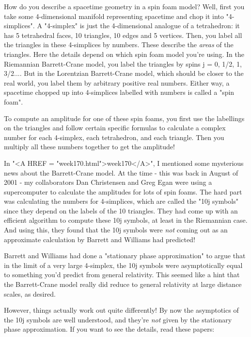 How do you describe a spacetime geometry in a spin foam model?
Well, first you take some 4-dimensional manifold representing 
spacetime and chop it into "4-simplices".  A "4-simplex" is 
just the 4-dimensional analogue of a tetrahedron: it has 5 
tetrahedral faces, 10 triangles, 10 edges and 5 vertices.  
Then, you label all the triangles in these 4-simplices by numbers.  
These describe the \emph{areas} of the triangles.  Here the details 
depend on which spin foam model you're using.  In the Riemannian 
Barrett-Crane model, you label the triangles by spins j = 0, 1/2, 
1, 3/2....  But in the Lorentzian Barrett-Crane model, which 
should be closer to the real world, you label them by arbitrary 
positive real numbers.   Either way, a spacetime chopped up into 
4-simplices labelled with numbers is called a "spin foam".

To compute an amplitude for one of these spin foams, you first use 
the labellings on the triangles and follow certain specific formulas
to calculate a complex number for each 4-simplex, each tetrahedron, 
and each triangle.  Then you multiply all these numbers together 
to get the amplitude!  

In "<A HREF = "week170.html">week170</A>", I mentioned some mysterious news about the Barrett-Crane 
model.  At the time - this was back in August of 2001 - my collaborators
Dan Christensen and Greg Egan were using a supercomputer to calculate 
the amplitudes for lots of spin foams.  The hard part was calculating 
the numbers for 4-simplices, which are called the "10j symbols" since 
they depend on the labels of the 10 triangles.  They had come up with 
an efficient algorithm to compute these 10j symbols, at least in the 
Riemannian case.  And using this, they found that the 10j symbols were 
\emph{not} coming out as an approximate calculation by Barrett and Williams 
had predicted!

Barrett and Williams had done a "stationary phase approximation" to
argue that in the limit of a very large 4-simplex, the 10j symbols
were asymptotically equal to something you'd predict from general
relativity.  This seemed like a hint that the Barrett-Crane model 
really did reduce to general relativity at large distance scales, 
as desired.

However, things actually work out quite differently!  By now
the asymptotics of the 10j symbols are well understood, and they're
\emph{not} given by the stationary phase approximation.  If you want to 
see the details, read these papers:

